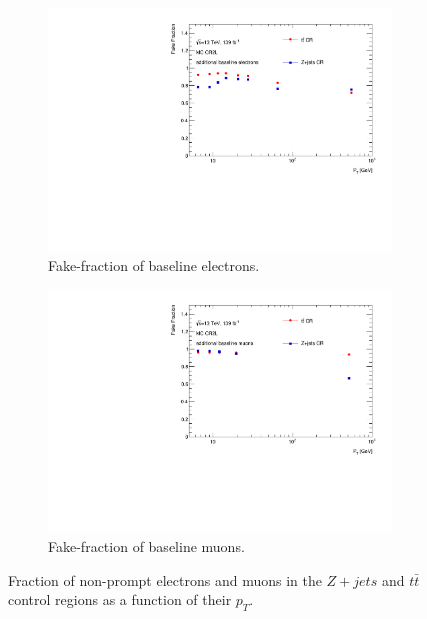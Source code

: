 \begin{figure}[!htbp]
    \begin{subfigure}{.49\textwidth}
        \centering
        \includegraphics[width=.9\linewidth]{figures/Analysis/Background/FakeFractionBaselineElectrons.pdf}
        \caption{Fake-fraction of baseline electrons.}
    \end{subfigure}
    \begin{subfigure}{.49\textwidth}
        \centering
        \includegraphics[width=.9\linewidth]{figures/Analysis/Background/FakeFractionBaselineMuons.pdf}
        \caption{Fake-fraction of baseline muons.}
    \end{subfigure}
        \caption{Fraction of non-prompt electrons and muons in the $Z+jets$ and $t\bar{t}$ control regions as a function of their $p_{T}$. \label{fig:FakeFractionBaseline}}
\end{figure}

